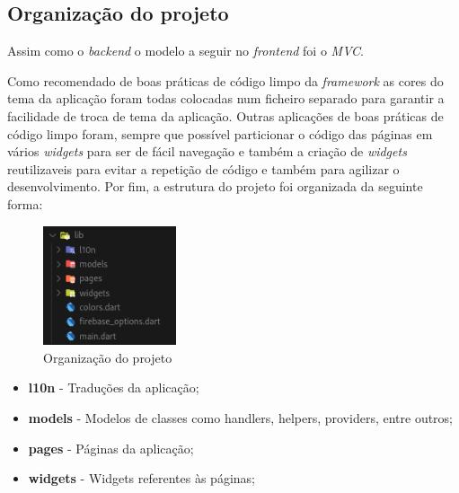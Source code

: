 \subsection{Organização do projeto}
Assim como o \textit{backend} o modelo a seguir no \textit{frontend} foi o \textit{MVC}. 

Como recomendado de boas práticas de código limpo da \textit{framework} as cores do tema da aplicação foram todas colocadas num ficheiro separado para garantir a facilidade de troca de tema da aplicação. Outras aplicações de boas práticas de código limpo foram, sempre que possível particionar o código das páginas em vários \textit{widgets} para ser de fácil navegação e também a criação de \textit{widgets} reutilizaveis para evitar a repetição de código e também para agilizar o desenvolvimento. Por fim, a estrutura do projeto foi organizada da seguinte forma:
\begin{figure}[htb]
  \centering
  \includegraphics[width=0.35\textwidth]{images/implementacao/frontend/organizacao_projeto.png}
  \caption{Organização do projeto}
  \label{fig:69}
\end{figure}

\begin{itemize}
  \item \textbf{l10n} - Traduções da aplicação;
  \item \textbf{models} - Modelos de classes como handlers, helpers, providers, entre outros;
  \item \textbf{pages} - Páginas da aplicação;
  \item \textbf{widgets} - Widgets referentes às páginas;
\end{itemize}
\vspace{60mm}


